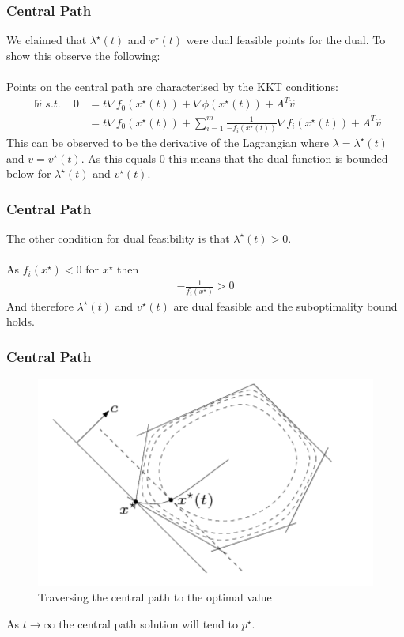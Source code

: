 \documentclass{beamer}
\begin{document}
\begin{frame}
    \frametitle{Central Path}
    We claimed that $\lambda^{\star}(t)$ and $v^{\star}(t)$ were dual feasible
    points for the dual. To show this observe the following:
    \\~\\
    Points on the central path are characterised by the KKT conditions:
    {\footnotesize
    \begin{align*}
        \exists \hat{v}\,\, s.t.  \, \, \,\, \, \, \,
        0 &= t\nabla f_{0}(x^{\star}(t)) + \nabla\phi(x^{\star}(t)) +
        A^{T}\hat{v} \\
        &= t \nabla f_{0}(x^{\star}(t)) +
        \sum\limits_{i=1}^{m}\frac{1}{-f_{i}(x^{\star}(t))}\nabla
        f_{i}(x^{\star}(t)) + A^{T}\hat{v}
    \end{align*}}
    This can be observed to be the derivative of the Lagrangian where $\lambda =
    \lambda^{\star}(t)$ and $v = v^{\star}(t)$. As this equals 0 this means that
    the dual function is bounded below for $\lambda^{\star}(t)$ and
    $v^{\star}(t)$.
\end{frame}

\begin{frame}
    \frametitle{Central Path}
    The other condition for dual feasibility is that $\lambda^{\star}(t) >
    0$.
    \\~\\
    As $f_{i}(x^{\star}) < 0$ for $x^{\star}$ then
    \begin{align*}
        -\frac{1}{f_{i}(x^{\star})} > 0
    \end{align*}
    And therefore $\lambda^{\star}(t)$ and
    $v^{\star}(t)$ are dual feasible and the suboptimality bound holds.
\end{frame}


\begin{frame}
    \frametitle{Central Path}
    \begin{figure}[t]
        \centering
        \includegraphics[scale=0.25]{central_path}
        \caption{Traversing the central path to the optimal value}
        \label{fig:central path}
    \end{figure}
    \vspace{-5mm}
    As $t \rightarrow \infty$ the central path solution will tend to
    $p^{\star}$.
\end{frame}
\end{document}
